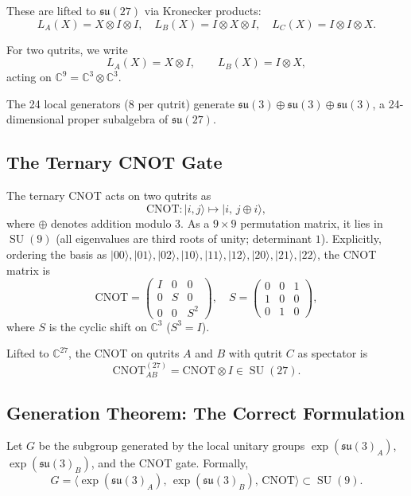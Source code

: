 \documentclass[12pt,a4paper]{article}
\newcommand{\SU}{\operatorname{SU}}
\begin{document}
These are lifted to $\mathfrak{su}(27)$ via Kronecker products:
\[
L_{A}(X) = X \otimes I \otimes I,\quad
L_{B}(X) = I \otimes X \otimes I,\quad
L_{C}(X) = I \otimes I \otimes X.
\]

For two qutrits, we write
\[
L_{A}(X) = X \otimes I,\qquad
L_{B}(X) = I \otimes X,
\]
acting on $\mathbb{C}^9 = \mathbb{C}^3 \otimes \mathbb{C}^3$.

The 24 local generators ($8$ per qutrit) generate
$\mathfrak{su}(3) \oplus \mathfrak{su}(3) \oplus \mathfrak{su}(3)$,
a 24-dimensional proper subalgebra of $\mathfrak{su}(27)$.

\subsection{The Ternary CNOT Gate}

The ternary CNOT acts on two qutrits as
\[
\text{CNOT}: |i,j\rangle \mapsto |i,\, j \oplus i\rangle,
\]
where $\oplus$ denotes addition modulo 3. As a $9 \times 9$ permutation
matrix, it lies in $\SU(9)$ (all eigenvalues are third roots of unity;
determinant $1$). Explicitly, ordering the basis as
$|00\rangle,|01\rangle,|02\rangle,|10\rangle,|11\rangle,|12\rangle,
|20\rangle,|21\rangle,|22\rangle$, the CNOT matrix is
\[
\text{CNOT} = \begin{pmatrix}
I & 0 & 0 \\
0 & S & 0 \\
0 & 0 & S^2
\end{pmatrix},
\quad
S = \begin{pmatrix}0&0&1\\1&0&0\\0&1&0\end{pmatrix},
\]
where $S$ is the cyclic shift on $\mathbb{C}^3$ ($S^3 = I$).

Lifted to $\mathbb{C}^{27}$, the CNOT on qutrits $A$ and $B$ with qutrit $C$
as spectator is
\[
\text{CNOT}_{AB}^{(27)} = \text{CNOT} \otimes I \in \SU(27).
\]

\subsection{Generation Theorem: The Correct Formulation}
\label{sec:groupformulation}

Let $G$ be the subgroup generated by the local unitary groups
$\exp(\mathfrak{su}(3)_A)$, $\exp(\mathfrak{su}(3)_B)$, and the CNOT gate.
Formally,
\[
G = \langle \exp(\mathfrak{su}(3)_A),\,
\exp(\mathfrak{su}(3)_B),\, \text{CNOT} \rangle \subset \SU(9).
\]
\end{document}
